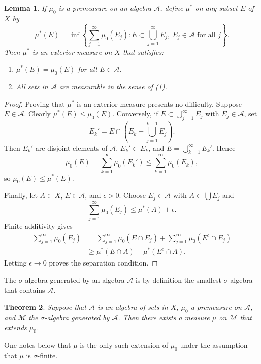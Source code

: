 \documentclass[11pt,openany]{book}
\newtheorem{theorem}{Theorem}[section]
\newtheorem{lemma}[theorem]{Lemma}
\begin{document}
\begin{lemma}
If $\mu_0$ is a premeasure on an algebra $\mathcal A$, define $\mu^*$ on any subset $E$ of $X$ by
\[
\mu^*(E)=\inf\left\{\sum_{j=1}^{\infty}\mu_0(E_j):
E\subset\bigcup_{j=1}^{\infty}E_j,\ E_j\in\mathcal A\text{ for all }j\right\}.
\]
Then $\mu^*$ is an exterior measure on $X$ that satisfies:
\begin{enumerate}
\item[(i)] $\mu^*(E)=\mu_0(E)$ for all $E\in\mathcal A$.
\item[(ii)] All sets in $\mathcal A$ are measurable in the sense of (1).
\end{enumerate}
\end{lemma}

\begin{proof}
Proving that $\mu^*$ is an exterior measure presents no difficulty. Suppose $E\in\mathcal A$. Clearly $\mu^*(E)\leq\mu_0(E)$. Conversely, if $E\subset\bigcup_{j=1}^{\infty}E_j$ with $E_j\in\mathcal A$, set
\[
E_k'=E\cap\left(E_k-\bigcup_{j=1}^{k-1}E_j\right).
\]
Then $E_k'$ are disjoint elements of $\mathcal A$, $E_k'\subset E_k$, and $E=\bigcup_{k=1}^{\infty}E_k'$. Hence
\[
\mu_0(E)=\sum_{k=1}^{\infty}\mu_0(E_k')\leq\sum_{k=1}^{\infty}\mu_0(E_k),
\]
so $\mu_0(E)\leq\mu^*(E)$.

Finally, let $A\subset X$, $E\in\mathcal A$, and $\epsilon>0$. Choose $E_j\in\mathcal A$ with $A\subset\bigcup E_j$ and
\[
\sum_{j=1}^{\infty}\mu_0(E_j)\leq\mu^*(A)+\epsilon.
\]
Finite additivity gives
\begin{align*}
\sum_{j=1}^{\infty}\mu_0(E_j)
&=\sum_{j=1}^{\infty}\mu_0(E\cap E_j)+\sum_{j=1}^{\infty}\mu_0(E^c\cap E_j)\\
&\geq \mu^*(E\cap A)+\mu^*(E^c\cap A).
\end{align*}
Letting $\epsilon\to0$ proves the separation condition.
\end{proof}

The $\sigma$-algebra generated by an algebra $\mathcal A$ is by definition the smallest $\sigma$-algebra that contains $\mathcal A$.

\begin{theorem}
Suppose that $\mathcal A$ is an algebra of sets in $X$, $\mu_0$ a premeasure on $\mathcal A$, and $\mathcal M$ the $\sigma$-algebra generated by $\mathcal A$. Then there exists a measure $\mu$ on $\mathcal M$ that extends $\mu_0$.
\end{theorem}

One notes below that $\mu$ is the only such extension of $\mu_0$ under the assumption that $\mu$ is $\sigma$-finite.
\end{document}
